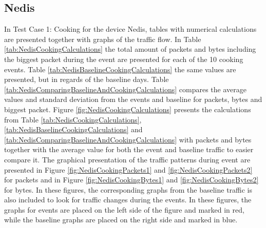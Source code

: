 \newpage
\subsection{Nedis}
In Test Case 1: Cooking for the device Nedis, tables with numerical calculations are presented together with graphs of the traffic flow. In Table \ref{tab:NedisCookingCalculations} the total amount of packets and bytes including the biggest packet during the event are presented for each of the 10 cooking events. Table \ref{tab:NedisBaselineCookingCalculations} the same values are presented, but in regards of the baseline days. Table \ref{tab:NedisComparingBaselineAndCookingCalculations} compares the average values and standard deviation from the events and baseline for packets, bytes and biggest packet. Figure \ref{fig:NedisCookingCalculations} presents the calculations from Table \ref{tab:NedisCookingCalculations}, \ref{tab:NedisBaselineCookingCalculations} and \ref{tab:NedisComparingBaselineAndCookingCalculations} with packets and bytes together with the average value for both the event and baseline traffic to easier compare it. The graphical presentation of the traffic patterns during event are presented in Figure \ref{fig:NedisCookingPackets1} and \ref{fig:NedisCookingPackets2} for packets and in Figure \ref{fig:NedisCookingBytes1} and \ref{fig:NedisCookingBytes2} for bytes. In these figures, the corresponding graphs from the baseline traffic is also included to look for traffic changes during the events. In these figures, the graphs for events are placed on the left side of the figure and marked in red, while the baseline graphs are placed on the right side and marked in blue.    

